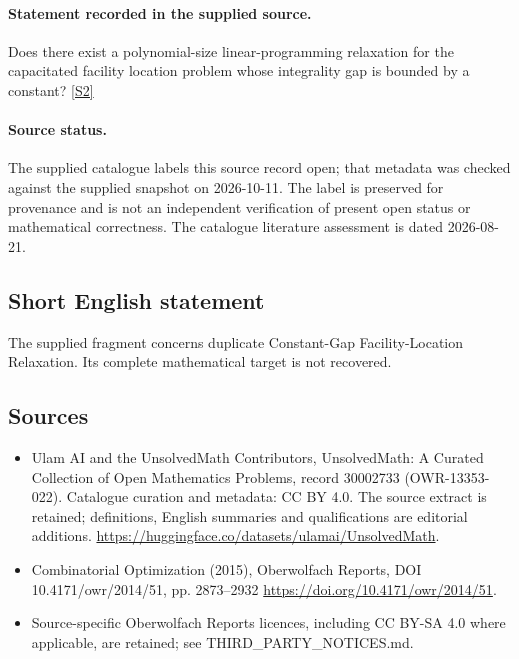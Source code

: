\documentclass[11pt]{article}
\newcommand{\sref}[2]{\hyperlink{source:#1:#2}{[S#2]}}
\begin{document}
\paragraph{Statement recorded in the supplied source.}
Does there exist a polynomial-size linear-programming relaxation for the capacitated facility location problem whose integrality gap is bounded by a constant? \sref{30002733}{2}
\paragraph{Source status.}
The supplied catalogue labels this source record open; that metadata was checked against the supplied snapshot on 2026-10-11. The label is preserved for provenance and is not an independent verification of present open status or mathematical correctness. The catalogue literature assessment is dated 2026-08-21.
\subsection{Short English statement}
The supplied fragment concerns duplicate Constant-Gap Facility-Location Relaxation. Its complete mathematical target is not recovered.
\subsection{Sources}
\begin{itemize}
\item[\hypertarget{source:30002733:1}{S1}] Ulam AI and the UnsolvedMath Contributors, UnsolvedMath: A Curated Collection of Open Mathematics Problems, record 30002733 (OWR-13353-022). Catalogue curation and metadata: CC BY 4.0. The source extract is retained; definitions, English summaries and qualifications are editorial additions.
\url{https://huggingface.co/datasets/ulamai/UnsolvedMath}.
\item[\hypertarget{source:30002733:2}{S2}] Combinatorial Optimization (2015), Oberwolfach Reports, DOI 10.4171/owr/2014/51, pp. 2873--2932
\url{https://doi.org/10.4171/owr/2014/51}.
\item Source-specific Oberwolfach Reports licences, including CC BY-SA 4.0 where applicable, are retained; see THIRD\_PARTY\_NOTICES.md.
\end{itemize}
\end{document}
